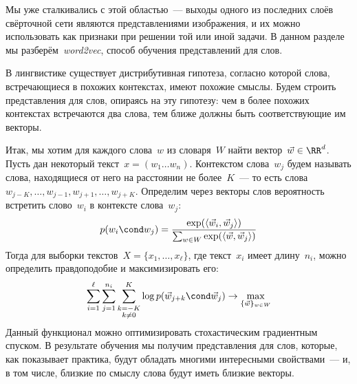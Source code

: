 \documentclass[12pt,fleqn]{article}
\begin{document}
Мы уже сталкивались с этой областью~--- выходы одного из последних слоёв свёрточной сети
являются представлениями изображения, и их можно использовать как признаки при решении
той или иной задачи.
В данном разделе мы разберём~\emph{word2vec}, способ обучения представлений для слов.

В лингвистике существует дистрибутивная гипотеза, согласно которой слова, встречающиеся в похожих контекстах,
имеют похожие смыслы.
Будем строить представления для слов, опираясь на эту гипотезу: чем в более похожих контекстах встречаются два слова,
тем ближе должны быть соответствующие им векторы.

Итак, мы хотим для каждого слова~$w$ из словаря~$W$ найти вектор~$\vec w \in \RR^d$.
Пусть дан некоторый текст~$x = (w_{1} \dots w_{n})$.
Контекстом слова~$w_j$ будем называть слова, находящиеся от него на расстоянии не более~$K$~---
то есть слова~$w_{j - K}, \dots, w_{j - 1}, w_{j + 1}, \dots, w_{j + K}$.
Определим через векторы слов вероятность встретить слово~$w_i$ в контексте слова~$w_j$:
\[
    p(w_i \cond w_j)
    =
    \frac{
        \exp(
            \langle \vec w_i, \vec w_j \rangle
        )
    }{
        \sum_{w \in W}
            \exp(
                \langle \vec w, \vec w_j \rangle
            )
    }
\]
Тогда для выборки текстов~$X = \{x_1, \dots, x_\ell\}$,
где текст~$x_i$ имеет длину~$n_i$,
можно определить правдоподобие и максимизировать его:
\[
    \sum_{i = 1}^{\ell}
    \sum_{j = 1}^{n_i}
    \sum_{\substack{{k = -K} \\ {k \neq 0}}}^{K}
        \log p(\vec w_{j + k} \cond \vec w_j)
    \to
    \max_{\{\vec w\}_{w \in W}}
\]
Данный функционал можно оптимизировать стохастическим градиентным спуском.
В результате обучения мы получим представления для слов, которые, как показывает практика,
будут обладать многими интересными свойствами~--- и, в том числе, близкие по смыслу слова будут
иметь близкие векторы.
\end{document}
